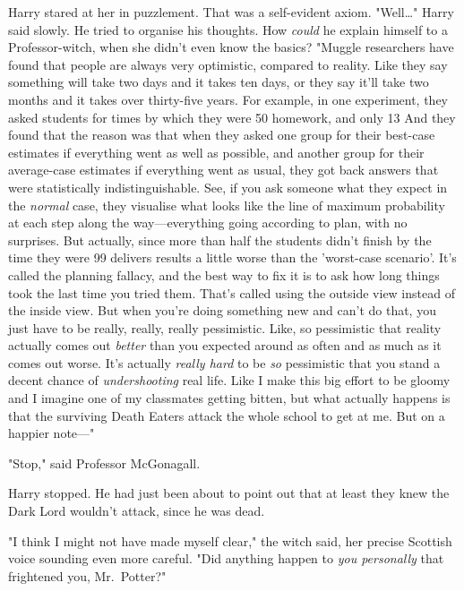 Harry stared at her in puzzlement. That was a self-evident axiom. 
"Well{\ldots}" Harry said slowly. He tried to organise his thoughts. How 
\emph{could} he explain himself to a Professor-witch, when she didn't even know 
the basics? "Muggle researchers have found that people are always very 
optimistic, compared to reality. Like they say something will take two days and 
it takes ten days, or they say it'll take two months and it takes over 
thirty-five years. For example, in one experiment, they asked students for 
times by which they were 50%
homework, and only 13%
And they found that the reason was that when they asked one group for their 
best-case estimates if everything went as well as possible, and another group 
for their average-case estimates if everything went as usual, they got back 
answers that were statistically indistinguishable. See, if you ask someone what 
they expect in the \emph{normal} case, they visualise what looks like the line 
of maximum probability at each step along the way---everything going according 
to plan, with no surprises. But actually, since more than half the students 
didn't finish by the time they were 99%
delivers results a little worse than the 'worst-case scenario'. It's called the 
planning fallacy, and the best way to fix it is to ask how long things took the 
last time you tried them. That's called using the outside view instead of the 
inside view. But when you're doing something new and can't do that, you just 
have to be really, really, really pessimistic. Like, so pessimistic that 
reality actually comes out \emph{better} than you expected around as often and 
as much as it comes out worse. It's actually \emph{really hard} to be \emph{so} 
pessimistic that you stand a decent chance of \emph{undershooting} real life. 
Like I make this big effort to be gloomy and I imagine one of my classmates 
getting bitten, but what actually happens is that the surviving Death Eaters 
attack the whole school to get at me. But on a happier note---"

"Stop," said Professor McGonagall.

Harry stopped. He had just been about to point out that at least they knew the 
Dark Lord wouldn't attack, since he was dead.

"I think I might not have made myself clear," the witch said, her precise 
Scottish voice sounding even more careful. "Did anything happen to \emph{you 
personally} that frightened you, Mr.~Potter?"

